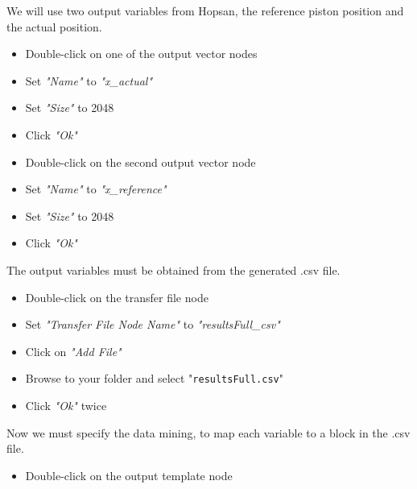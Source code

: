 \documentclass[a4paper]{article}
\begin{document}
\begin{tutenumerate}
\begin{enumerate}
We will use two output variables from Hopsan, the reference piston position and the actual position.
\begin{itemize}
\item Double-click on one of the output vector nodes


\item Set \textit{"Name"} to \textit{"x\_actual"}
\item Set \textit{"Size"} to 2048
\item Click \textit{"Ok"}
\item Double-click on the second output vector node
\item Set \textit{"Name"} to \textit{"x\_reference"}
\item Set \textit{"Size"} to 2048
\item Click \textit{"Ok"}
\end{itemize}

The output variables must be obtained from the generated .csv file.
\begin{itemize}
\item Double-click on the transfer file node


\item Set \textit{"Transfer File Node Name"} to \textit{"resultsFull\_csv"}
\item Click on \textit{"Add File"}
\item Browse to your folder and select "\texttt{resultsFull.csv}"
\item Click \textit{"Ok"} twice
\end{itemize}

Now we must specify the data mining, to map each variable to a block in the .csv file.
\begin{itemize}
\item Double-click on the output template node



\end{itemize}
\end{enumerate}
\end{tutenumerate}
\end{document}
